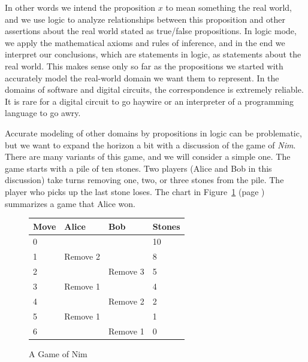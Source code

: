 {In other words we intend the proposition $x$
to mean something the real world,
and we use logic to analyze relationships between this proposition and other
assertions about the real world stated as true/false propositions.
In logic mode, we apply the mathematical axioms and rules of inference,
and in the end we interpret our conclusions, which are statements in logic,
as statements about the real world.
This makes sense only so far as the propositions we started with
accurately model the real-world domain we want them to represent.
In the domains of software and digital circuits,
the correspondence is extremely reliable.
It is rare for a digital circuit to go haywire or an interpreter of
a programming language to go awry.

Accurate modeling of other domains by propositions in logic can be problematic,
but we want to expand the horizon a bit with a discussion
of the game of \emph{Nim}.
There are many variants of this game, and we will consider a simple one.
The game starts with a pile of ten stones. Two players (Alice and Bob in this discussion)
take turns removing one, two, or three stones from the pile.
The player who picks up the last stone loses.
The chart in
Figure~\ref{fig:example-nim-game} (page \pageref{fig:example-nim-game})
summarizes a game that Alice won.

\begin{figure}
\begin{center}
\begin{tabular}{l|l|l|l}
Move & Alice     & Bob      & Stones \\
\hline
0    &           &          & 10     \\
1    & Remove 2  &          & 8      \\
2    &           & Remove 3 & 5      \\
3    & Remove 1  &          & 4      \\
4    &           & Remove 2 & 2      \\
5    & Remove 1  &          & 1      \\
6    &           & Remove 1 & 0      \\
\end{tabular}
\end{center}
\caption{A Game of Nim}
\label{fig:example-nim-game}
\end{figure}

}
